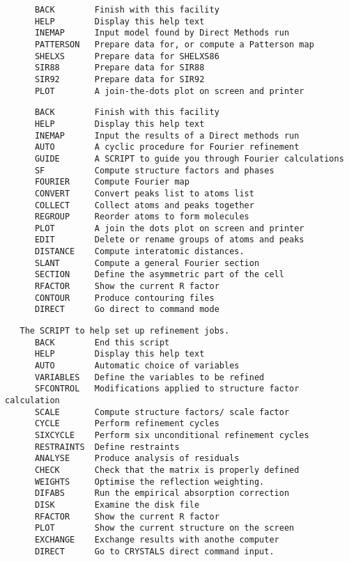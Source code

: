 \documentclass[10pt,a4paper]{report}
\begin{document}
\bigskip{}


\small\begin{verbatim}
      BACK        Finish with this facility
      HELP        Display this help text
      INEMAP      Input model found by Direct Methods run
      PATTERSON   Prepare data for, or compute a Patterson map
      SHELXS      Prepare data for SHELXS86
      SIR88       Prepare data for SIR88
      SIR92       Prepare data for SIR92
      PLOT        A join-the-dots plot on screen and printer
\end{verbatim}\normalsize




\bigskip{}


\small\begin{verbatim}
      BACK        Finish with this facility
      HELP        Display this help text
      INEMAP      Input the results of a Direct methods run
      AUTO        A cyclic procedure for Fourier refinement
      GUIDE       A SCRIPT to guide you through Fourier calculations
      SF          Compute structure factors and phases
      FOURIER     Compute Fourier map
      CONVERT     Convert peaks list to atoms list
      COLLECT     Collect atoms and peaks together
      REGROUP     Reorder atoms to form molecules
      PLOT        A join the dots plot on screen and printer
      EDIT        Delete or rename groups of atoms and peaks
      DISTANCE    Compute interatomic distances.
      SLANT       Compute a general Fourier section
      SECTION     Define the asymmetric part of the cell
      RFACTOR     Show the current R factor
      CONTOUR     Produce contouring files
      DIRECT      Go direct to command mode
\end{verbatim}\normalsize




\bigskip{}


\small\begin{verbatim}
   The SCRIPT to help set up refinement jobs.
      BACK        End this script
      HELP        Display this help text
      AUTO        Automatic choice of variables
      VARIABLES   Define the variables to be refined
      SFCONTROL   Modifications applied to structure factor calculation
      SCALE       Compute structure factors/ scale factor
      CYCLE       Perform refinement cycles
      SIXCYCLE    Perform six unconditional refinement cycles
      RESTRAINTS  Define restraints
      ANALYSE     Produce analysis of residuals
      CHECK       Check that the matrix is properly defined
      WEIGHTS     Optimise the reflection weighting.
      DIFABS      Run the empirical absorption correction
      DISK        Examine the disk file
      RFACTOR     Show the current R factor
      PLOT        Show the current structure on the screen
      EXCHANGE    Exchange results with anothe computer
      DIRECT      Go to CRYSTALS direct command input.
\end{verbatim}\normalsize
\end{document}
